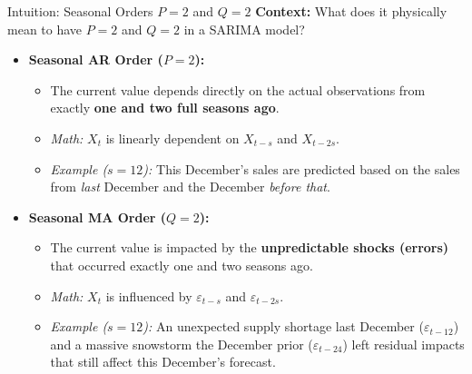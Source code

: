 \documentclass[aspectratio=169]{beamer}
\begin{document}
\begin{frame}{Intuition: Seasonal Orders $P=2$ and $Q=2$}
\textbf{Context:} What does it physically mean to have $P=2$ and $Q=2$ in a SARIMA model?

\vspace{0.2cm}
\begin{itemize}
    \item \textbf{Seasonal AR Order ($P=2$):}
    \begin{itemize}
        \item The current value depends directly on the actual observations from exactly \textbf{one and two full seasons ago}.
        \item \textit{Math:} $X_t$ is linearly dependent on $X_{t-s}$ and $X_{t-2s}$.
        \item \textit{Example ($s=12$):} This December's sales are predicted based on the sales from \textit{last} December and the December \textit{before that}.
    \end{itemize}
    
    \vspace{0.3cm}
    
    \item \textbf{Seasonal MA Order ($Q=2$):}
    \begin{itemize}
        \item The current value is impacted by the \textbf{unpredictable shocks (errors)} that occurred exactly one and two seasons ago.
        \item \textit{Math:} $X_t$ is influenced by $\varepsilon_{t-s}$ and $\varepsilon_{t-2s}$.
        \item \textit{Example ($s=12$):} An unexpected supply shortage last December ($\varepsilon_{t-12}$) and a massive snowstorm the December prior ($\varepsilon_{t-24}$) left residual impacts that still affect this December's forecast.
    \end{itemize}
\end{itemize}
\end{frame}
\end{document}
